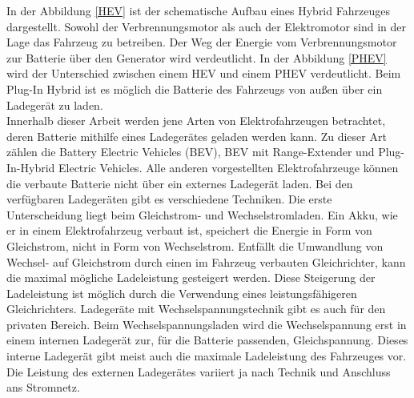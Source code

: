 In der Abbildung \ref{HEV} ist der schematische Aufbau eines Hybrid Fahrzeuges dargestellt. Sowohl der Verbrennungsmotor als auch der Elektromotor sind in der Lage das Fahrzeug zu betreiben. Der Weg der Energie vom Verbrennungsmotor zur Batterie über den Generator wird verdeutlicht. In der Abbildung \ref{PHEV} wird der Unterschied zwischen einem HEV und einem PHEV verdeutlicht. Beim Plug-In Hybrid ist es möglich die Batterie des Fahrzeugs von außen über ein Ladegerät zu laden.\\
Innerhalb dieser Arbeit werden jene Arten von Elektrofahrzeugen betrachtet, deren Batterie mithilfe eines Ladegerätes geladen werden kann. Zu dieser Art zählen die Battery Electric Vehicles (BEV), BEV mit Range-Extender und Plug-In-Hybrid Electric Vehicles. Alle anderen vorgestellten Elektrofahrzeuge können die verbaute Batterie nicht über ein externes Ladegerät laden. Bei den verfügbaren Ladegeräten gibt es verschiedene Techniken. Die erste Unterscheidung liegt beim Gleichstrom- und Wechselstromladen. Ein Akku, wie er in einem Elektrofahrzeug verbaut ist, speichert die Energie in Form von Gleichstrom, nicht in Form von Wechselstrom. Entfällt die Umwandlung von Wechsel- auf Gleichstrom durch einen im Fahrzeug verbauten Gleichrichter, kann die maximal mögliche Ladeleistung gesteigert werden. Diese Steigerung der Ladeleistung ist möglich durch die Verwendung eines leistungsfähigeren Gleichrichters. Ladegeräte mit Wechselspannungstechnik gibt es auch für den privaten Bereich. Beim Wechselspannungsladen wird die Wechselspannung erst in einem internen Ladegerät zur, für die Batterie passenden, Gleichspannung. Dieses interne Ladegerät gibt meist auch die maximale Ladeleistung des Fahrzeuges vor. Die Leistung des externen Ladegerätes variiert ja nach Technik und Anschluss ans Stromnetz. \\
